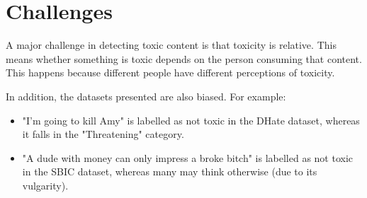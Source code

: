 \section{Challenges}

A major challenge in detecting toxic content is that toxicity is relative.
This means whether something is toxic depends on the person consuming that content.
This happens because different people have different perceptions of toxicity.

In addition, the datasets presented are also biased.
For example:

\begin{itemize}
    \item "I'm going to kill Amy" is labelled as not toxic in the DHate dataset, whereas it falls in the "Threatening" category.
    \item "A dude with money can only impress a broke bitch" is labelled as not toxic in the SBIC dataset, whereas many may think otherwise (due to its vulgarity).
\end{itemize}
